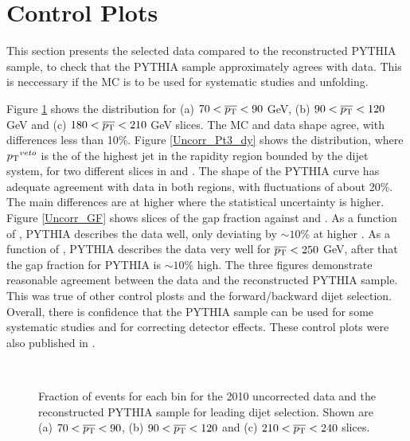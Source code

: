 \section{Control Plots}
\label{sec:GBJ1:Uncorr}
This section presents the selected data compared to the reconstructed PYTHIA sample, to check that the PYTHIA sample approximately agrees with data.
This is neccessary if the MC is to be used for systematic studies and unfolding.


Figure \ref{UncorrIncl_dy} shows the \Incl{} distribution for (a) $70<\mbox{$\overline{p_{\rm T}}$}{}<90$ GeV, (b) $90<\mbox{$\overline{p_{\rm T}}$}{}<120$ GeV and (c) $180<\mbox{$\overline{p_{\rm T}}$}{}<210$ GeV slices. 
The MC and data shape agree, with differences less than 10\%.
Figure \ref{Uncorr_Pt3_dy} shows the \ptDist{} distribution, where $\mbox{$p_{\rm T}$}{}^{veto}$ is the \pt{} of the highest jet in the rapidity region bounded by the dijet system,  for two different slices in \dy{} and \ptb{}. 
The shape of the PYTHIA curve has adequate agreement with data in both regions, with fluctuations of about 20\%.
The main differences are at higher \pt{} where the statistical uncertainty is higher.
Figure \ref{Uncorr_GF} shows slices of the gap fraction against \dy{} and \ptb{}.
As a function of \dy{}, PYTHIA describes the data well, only deviating by $\sim10\%$ at higher \dy{}.
As a function of \ptb{}, PYTHIA describes the data very well for $\mbox{$\overline{p_{\rm T}}$}{}<250$ GeV, after that the gap fraction for PYTHIA is $\sim10\%$ high.
The three figures demonstrate reasonable agreement between the data and the reconstructed PYTHIA sample. 
This was true of other control plosts and the forward/backward dijet selection.
Overall, there is confidence that the PYTHIA sample can be used for some systematic studies and for correcting detector effects. 
These control plots were also published in \cite{ref:ATLASGap}.

\begin{figure}
\centering
\mbox{
              \quad
              \quad
}
\mbox{
              \quad
                              }
\caption[Comparison of the inclusive distribution verses \dy{} between the data and the reconstructed PYTHIA sample for the leading \pt{} dijet selection]{
Fraction of events for each \dy{} bin for the 2010 uncorrected data and the reconstructed PYTHIA sample for leading \pt{} dijet selection. 
Shown are (a) $70<\mbox{$\overline{p_{\rm T}}$}{}<90$, (b) $90<\mbox{$\overline{p_{\rm T}}$}{}<120$ and (c) $210<\mbox{$\overline{p_{\rm T}}$}{}<240$ slices.
\label{UncorrIncl_dy}}
\end{figure}

